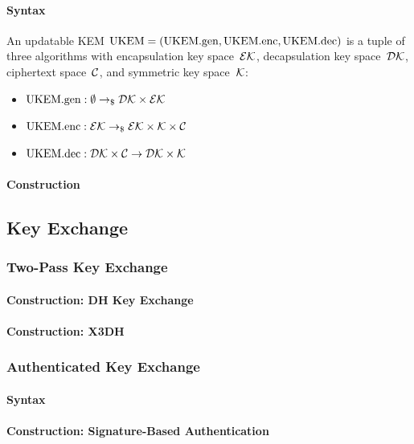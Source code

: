 \documentclass[a4paper,orivec]{llncs}
\begin{document}
\paragraph{Syntax}
An updatable KEM $\mathrm{UKEM}=(\mathrm{UKEM}.\mathrm{gen},\mathrm{UKEM}.\mathrm{enc},\mathrm{UKEM}.\mathrm{dec})$ is a tuple of three algorithms with encapsulation key space~$\mathcal{EK}$, decapsulation key space~$\mathcal{DK}$, ciphertext space~$\mathcal{C}$, and symmetric key space~$\mathcal{K}$:

\begin{itemize}
    \item $\mathrm{UKEM}.\mathrm{gen}: \emptyset \to_\$ \mathcal{DK}\times\mathcal{EK}$
    \item $\mathrm{UKEM}.\mathrm{enc}: \mathcal{EK} \to_\$ \mathcal{EK}\times\mathcal{K}\times\mathcal{C}$
    \item $\mathrm{UKEM}.\mathrm{dec}: \mathcal{DK}\times\mathcal{C} \to \mathcal{DK}\times\mathcal{K}$
\end{itemize}

\paragraph{Construction}


\subsection{Key Exchange}

\subsubsection{Two-Pass Key Exchange}


\paragraph{Construction: DH Key Exchange}

\paragraph{Construction: X3DH}

\subsubsection{Authenticated Key Exchange}

\paragraph{Syntax}

\paragraph{Construction: Signature-Based Authentication}
\end{document}

